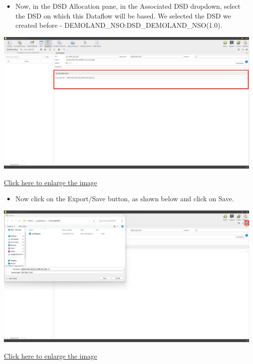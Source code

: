 \documentclass[
]{book}
\providecommand{\tightlist}{%
  \setlength{\itemsep}{0pt}\setlength{\parskip}{0pt}}
\begin{document}
\begin{itemize}
\tightlist
\item
  Now, in the DSD Allocation pane, in the Associated DSD dropdown, select the DSD on which this Dataflow will be based. We selected the DSD we created before - DEMOLAND\_NSO:DSD\_DEMOLAND\_NSO(1.0).
\end{itemize}

\begin{center}\includegraphics[width=1\linewidth]{./images/image267} \end{center}

\href{images/image267.png}{Click here to enlarge the image}

\begin{itemize}
\tightlist
\item
  Now click on the Export/Save button, as shown below and click on Save.
\end{itemize}

\begin{center}\includegraphics[width=1\linewidth]{./images/image268} \end{center}

\href{images/image268.png}{Click here to enlarge the image}
\end{document}
